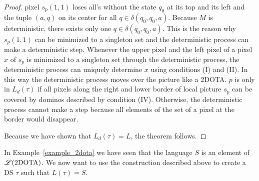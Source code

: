 \begin{proof}
pixel $s_p(1, 1)$ loses all\mirroredL's without the state $q_0$ at its top and its left and the
tuple $(a, q)$ on its center for all $q\in\delta(q_0, q_0, a)$. Because $M$ is deterministic, there
exists only one $q\in\delta(q_0, q_0, a)$. This is the reason why $s_p(1, 1)$ can be minimized to a
singleton set and the deterministic process can make a deterministic step. Whenever the upper pixel
and the left pixel of a pixel $x$ of $s_p$ is minimized to a singleton set through the deterministic
process, the deterministic process can uniquely determine $x$ using conditions (I) and (II).
In this way the deterministic process moves over the picture like a 2DOTA. $p$ is only in
$L_d(\tau)$ if all pixels along the right and lower border of local picture $s_p$ can be covered by
dominos described by condition (IV). Otherwise, the deterministic process cannot make a step
because all elements of the set of a pixel at the border would disappear.

Because we have shown that $L_d(\tau) = L$, the theorem follows.
\end{proof}
In Example~\ref{example_2dota} we have seen that the language $S$ is an element of
$\mathscr{L}(\text{2DOTA})$. We now want to use the construction described above to create a
DS $\tau$ such that $L(\tau) = S$.
